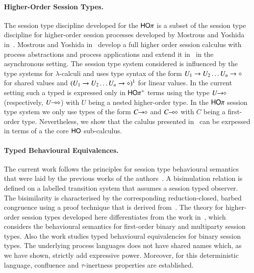 \paragraph{Higher-Order Session Types.}
The session type discipline developed for the $\mathsf{HO}\pi$ is a subset
of the session type discipline
for higher-order session processes developed by Mostrous and Yoshida
in~\cite{tlca07,mostrous09sessionbased}.
Mostrous and Yoshida in~\cite{tlca07} develop a full higher order session calculus
with process abstractions and process applications and extend it
in~\cite{mostrous09sessionbased} in the asynchronous setting.
The session type
system considered is influenced by the type systems for $\lambda$-calculi and
uses type syntax of the form $U_1 \rightarrow U_2 \dots U_n \rightarrow \diamond$
for shared values and $(U_1 \rightarrow U_2 \dots U_n \rightarrow \diamond)^{1}$
for linear values.
In the current setting such a typed is expressed only in $\mathsf{HO}\pi^{\mathsf +}$
terms using the type $U\!\! \rightarrow\!\! \diamond$ (respectively, $U\!\! \multimap\!\! \diamond$)
with $U$ being a nested higher-order type.
In the $\mathsf{HO}\pi$ session type system we only use types of the form
$C\!\! \rightarrow\!\! \diamond$ and $C\!\! \multimap\!\! \diamond$ with $C$ being a first-order type.
Nevertheless, we show that
the calulus presented in~\cite{tlca07} can be exrpessed in terms of a the
core $\mathsf{HO}$ sub-calculus.
 


\paragraph{Typed Behavioural Equivalences.}
The current work follows the principles for
session type behavioural semantics that were laid
by the previous works of the
authors~\cite{dkphdthesis,KYHH2015,KY2015}.
A bisimulation relation is defined on a labelled
transition system that assumes a session typed
observer.
The bisimilarity is characterised by the corresponding
reduction-closed, barbed congruence using a
proof technique that is derived from~\cite{Hennessy07}.
The theory for higher-order session types developed here
differentiates from 
the work in~\cite{dkphdthesis,KYHH2015,KY2015}, which 
considers the behavioural semantics for first-order
binary and multiparty session types.
Also the work \cite{DBLP:journals/iandc/PerezCPT14} studies typed behavioural equivalencies for binary session types.
The underlying process languages does not have shared names which, as we have shown, strictly add expressive power. 
Moreover, for this deterministic language, confluence and $\tau$-inertness properties are established.


